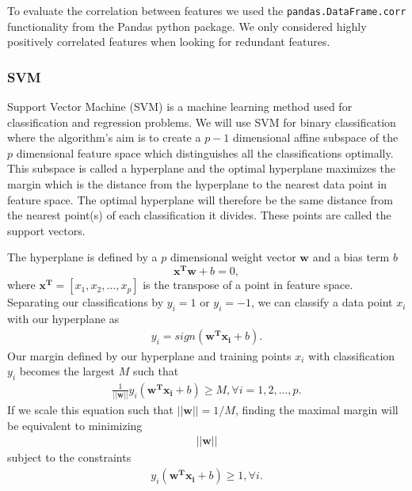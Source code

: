 To evaluate the correlation between features we used the 
\verb|pandas.DataFrame.corr| functionality from the Pandas python package. We
only considered highly positively correlated features when looking for
redundant features.   

















\subsubsection{SVM}
Support Vector Machine (SVM) is a machine learning method used for 
classification and regression problems. We will use SVM for binary 
classification where the algorithm's aim is to create a $p-1$ dimensional
affine subspace of the $p$ dimensional feature space which distinguishes all the 
classifications optimally. This subspace is called a hyperplane and the 
optimal hyperplane maximizes the margin which is the distance from the 
hyperplane to the nearest data point in feature space. The optimal hyperplane 
will therefore be the same distance from the nearest point(s) of each 
classification it divides. These points are called the support vectors.

The hyperplane is defined by a $p$ dimensional weight vector $\boldsymbol{w}$ and a 
bias term $b$
\begin{equation}
\boldsymbol{x^T}\boldsymbol{w} + b =0, 
\label{eq:hyperplane}
\end{equation}
where $\boldsymbol{x^T}=[x_1,x_2,...,x_p]$ is the transpose of a point in feature space.
Separating our classifications by $y_i=1$ or $y_i=-1$, we can classify a 
data point $x_i$ with our hyperplane as 
\begin{gather*}
y_i = sign(\boldsymbol{w^T}\boldsymbol{x_i}+b). 
\end{gather*}
Our margin defined by our hyperplane and training points $x_i$ with classification $y_i$ becomes the largest $M$ such that 
\begin{gather}
\frac{1}{||\boldsymbol{w}||}y_i(\boldsymbol{w^Tx_i}+b) \ge M, \forall i=1,2,...,p. 
\end{gather}
If we scale this equation such that $||\boldsymbol{w}||=1/M$, finding the maximal margin 
will be equivalent to minimizing 
\begin{gather*}
||\boldsymbol{w}||
\end{gather*}
subject to the constraints 
\begin{gather*}
y_i(\boldsymbol{w^Tx_i}+b) \ge 1, \forall i.
\end{gather*}

